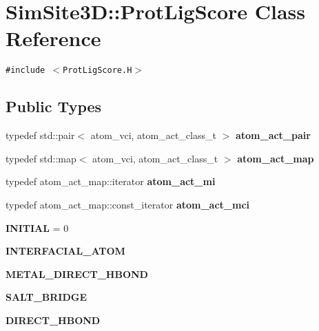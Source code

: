 \section{SimSite3D::Prot\-Lig\-Score Class Reference}
\label{classSimSite3D_1_1ProtLigScore}
{\tt \#include $<$Prot\-Lig\-Score.H$>$}

\subsection*{Public Types}
\begin{CompactItemize}
\item 
typedef std::pair$<$ atom\_\-vci, atom\_\-act\_\-class\_\-t $>$ \textbf{atom\_\-act\_\-pair}\label{classSimSite3D_1_1ProtLigScore_27d6d786f7b39152b361b23dd9d5bbbb}

\item 
typedef std::map$<$ atom\_\-vci, atom\_\-act\_\-class\_\-t $>$ \textbf{atom\_\-act\_\-map}\label{classSimSite3D_1_1ProtLigScore_ce33f05b2e4c44c586465cf372a608ec}

\item 
typedef atom\_\-act\_\-map::iterator \textbf{atom\_\-act\_\-mi}\label{classSimSite3D_1_1ProtLigScore_919ad4c17215dc1ca9072def5d1f6f80}

\item 
typedef atom\_\-act\_\-map::const\_\-iterator \textbf{atom\_\-act\_\-mci}\label{classSimSite3D_1_1ProtLigScore_bdea38e65c716d29e71ed2e4521eb36b}

\item 
\textbf{INITIAL} = 0\label{classSimSite3D_1_1ProtLigScore_38da0bbb70c6f5a88b37e99939fa72117efb63b928321c54411b880623ea0fb6}

\item 
\textbf{INTERFACIAL\_\-ATOM}\label{classSimSite3D_1_1ProtLigScore_38da0bbb70c6f5a88b37e99939fa7211500e8743a0b378fddf0d53d673a40b47}

\item 
\textbf{METAL\_\-DIRECT\_\-HBOND}\label{classSimSite3D_1_1ProtLigScore_38da0bbb70c6f5a88b37e99939fa7211e93fbf76a21bb4ea027750f686e0fece}

\item 
\textbf{SALT\_\-BRIDGE}\label{classSimSite3D_1_1ProtLigScore_38da0bbb70c6f5a88b37e99939fa72112a51642889c858139d7b520652703b81}

\item 
\textbf{DIRECT\_\-HBOND}\label{classSimSite3D_1_1ProtLigScore_38da0bbb70c6f5a88b37e99939fa7211803e8fc1cf125b935a73b960416972aa}


\end{CompactItemize}
